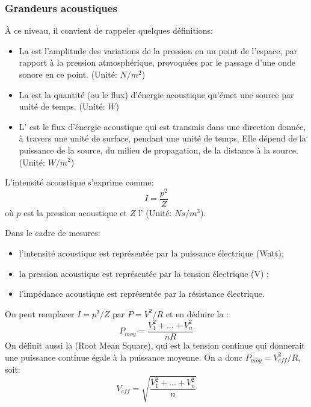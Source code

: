\medskip
\subsubsection{Grandeurs acoustiques}

À ce niveau, il convient de rappeler quelques définitions:
\begin{itemize}
   \item La  est l'amplitude des variations de la pression en un point de l'espace, par rapport à la pression atmosphérique, provoquées par le passage d'une onde sonore en ce point. (Unité: $N/m^2$)
   \item La  est la quantité (ou le flux) d'énergie acoustique qu'émet une source par unité de temps. (Unité: $W$)
   \item L' est le flux d'énergie acoustique qui est transmis dans une direction donnée, à travers une unité de surface, pendant une unité de temps. Elle dépend de la puissance de la source, du milieu de propagation, de la distance à la source. (Unité: $W/m^2$)
\end{itemize}

\medskip
L'intensité acoustique s'exprime comme:
\begin{equation}
I = \frac{p^2}{Z}
\end{equation}
où $p$ est la pression acoustique et $Z$ l' (Unité: $Ns/m^3$).

\begin{remarque}
Dans le cadre de mesures:
\begin{itemize}
   \item l'intensité acoustique est représentée par la puissance électrique (Watt);
   \item la pression acoustique est représentée par la tension électrique (V) ;
   \item l'impédance acoustique est représentée par la résistance électrique.
\end{itemize}
On peut remplacer $I = p^2/Z$ par $P = V^2/R$ et en déduire la :
\begin{equation}
P_{moy}=\dfrac{V_1^2+...+V_n^2}{nR}
\end{equation}
On définit aussi la  (Root Mean Square), qui est la tension continue qui donnerait une puissance continue égale à la puissance moyenne. On a donc $P_{moy}=V_{eff}^2/R$, soit:
\begin{equation}
V_{eff}=\sqrt{\dfrac{V_1^2+...+V_n^2}{n}}
\end{equation}
\end{remarque}

